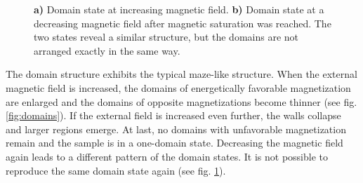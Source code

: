 \documentclass[a4paper]{scrartcl}
\numberwithin{equation}{section}
\numberwithin{figure}{section}
\numberwithin{table}{section}
\begin{document}
\begin{figure} 
 \centering
{} \hfill
{} 
\caption{ \small \textbf{a)} Domain state at increasing magnetic field. \textbf{b)} Domain state at a decreasing magnetic field after magnetic saturation was reached. The two states reveal a similar structure, but the domains are not arranged exactly in the same way.
  } 
	\label{fig:reaufbau}
\end{figure}






The domain structure exhibits the typical maze-like structure. When the external magnetic field is increased, the domains of energetically favorable magnetization are enlarged and the domains of opposite magnetizations become thinner (see fig. \ref{fig:domains}). If the external field is increased even further, the walls collapse and larger regions emerge. At last, no domains with unfavorable magnetization remain and the sample is in a one-domain state. Decreasing the magnetic field again leads to a different pattern of the domain states. It is not possible to reproduce the same domain state again (see fig. \ref{fig:reaufbau}).
\end{document}
